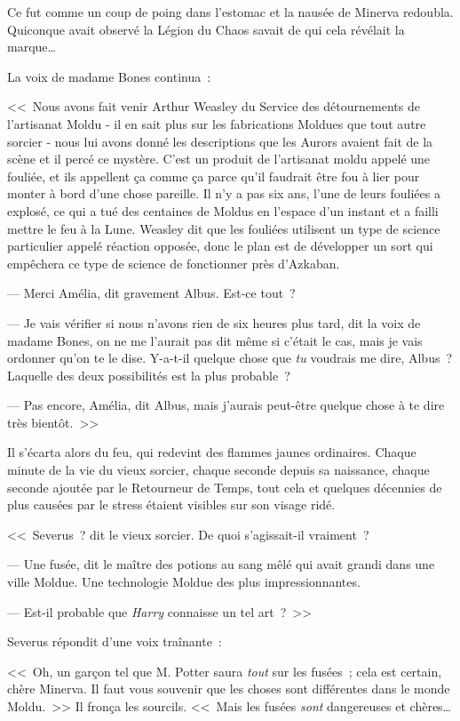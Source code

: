 Ce fut comme un coup de poing dans l'estomac et la nausée de Minerva redoubla. Quiconque avait observé la Légion du Chaos savait de qui cela révélait la marque…

La voix de madame Bones continua~:

<<~Nous avons fait venir Arthur Weasley du Service des détournements de l'artisanat Moldu - il en sait plus sur les fabrications Moldues que tout autre sorcier - nous lui avons donné les descriptions que les Aurors avaient fait de la scène et il percé ce mystère. C'est un produit de l'artisanat moldu appelé une fouliée, et ils appellent ça comme ça parce qu'il faudrait être fou à lier pour monter à bord d'une chose pareille. Il n'y a pas six ans, l'une de leurs fouliées a explosé, ce qui a tué des centaines de Moldus en l'espace d'un instant et a failli mettre le feu à la Lune. Weasley dit que les fouliées utilisent un type de science particulier appelé réaction opposée, donc le plan est de développer un sort qui empêchera ce type de science de fonctionner près d'Azkaban.

--- Merci Amélia, dit gravement Albus. Est-ce tout~?

--- Je vais vérifier si nous n'avons rien de six heures plus tard, dit la voix de madame Bones, on ne me l'aurait pas dit même si c'était le cas, mais je vais ordonner qu'on te le dise. Y-a-t-il quelque chose que \emph{tu} voudrais me dire, Albus~? Laquelle des deux possibilités est la plus probable~?

--- Pas encore, Amélia, dit Albus, mais j'aurais peut-être quelque chose à te dire très bientôt.~>>

Il s'écarta alors du feu, qui redevint des flammes jaunes ordinaires. Chaque minute de la vie du vieux sorcier, chaque seconde depuis sa naissance, chaque seconde ajoutée par le Retourneur de Temps, tout cela et quelques décennies de plus causées par le stress étaient visibles sur son visage ridé.

<<~Severus~? dit le vieux sorcier. De quoi s'agissait-il vraiment~?

--- Une fusée, dit le maître des potions au sang mêlé qui avait grandi dans une ville Moldue. Une technologie Moldue des plus impressionnantes.

--- Est-il probable que \emph{Harry} connaisse un tel art~?~>>

Severus répondit d'une voix traînante~:

<<~Oh, un garçon tel que M. Potter saura \emph{tout} sur les fusées~; cela est certain, chère Minerva. Il faut vous souvenir que les choses sont différentes dans le monde Moldu.~>> Il fronça les sourcils. <<~Mais les fusées \emph{sont} dangereuses et chères…


